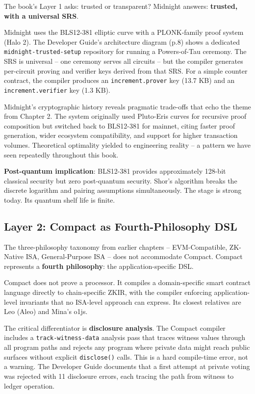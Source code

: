\documentclass[
  11pt,
  openany]{report}
\renewcommand{\textbf}[1]{{\bfseries\color{MidnightBold}#1}}
\begin{document}
The book's Layer 1 asks: trusted or transparent? Midnight answers:
\textbf{trusted, with a universal SRS}.

Midnight uses the BLS12-381 elliptic curve with a PLONK-family proof system
(Halo 2). The Developer Guide's architecture diagram (p.8) shows a dedicated
\texttt{midnight-trusted-setup} repository for running a Powers-of-Tau ceremony.
The SRS is universal -- one ceremony serves all circuits -- but the compiler
generates per-circuit proving and verifier keys derived from that SRS. For a
simple counter contract, the compiler produces an \texttt{increment.prover} key
(13.7 KB) and an \texttt{increment.verifier} key (1.3 KB).

Midnight's cryptographic history reveals pragmatic trade-offs that echo the
theme from Chapter 2. The system originally used Pluto-Eris curves for recursive
proof composition but switched back to BLS12-381 for mainnet, citing faster
proof generation, wider ecosystem compatibility, and support for higher
transaction volumes. Theoretical optimality yielded to engineering reality -- a
pattern we have seen repeatedly throughout this book.

\textbf{Post-quantum implication}: BLS12-381 provides approximately 128-bit
classical security but zero post-quantum security. Shor's algorithm breaks the
discrete logarithm and pairing assumptions simultaneously. The stage is strong
today. Its quantum shelf life is finite.

\subsection{Layer 2: Compact as Fourth-Philosophy
DSL}\label{layer-2-compact-as-fourth-philosophy-dsl}

The three-philosophy taxonomy from earlier chapters -- EVM-Compatible, ZK-Native
ISA, General-Purpose ISA -- does not accommodate Compact. Compact represents a
\textbf{fourth philosophy}: the application-specific DSL.

Compact does not prove a processor. It compiles a domain-specific smart contract
language directly to chain-specific ZKIR, with the compiler enforcing
application-level invariants that no ISA-level approach can express. Its closest
relatives are Leo (Aleo) and Mina's o1js.

The critical differentiator is \textbf{disclosure analysis}. The Compact
compiler includes a \texttt{track-witness-data} analysis pass that traces
witness values through all program paths and rejects any program where private
data might reach public surfaces without explicit \texttt{disclose()} calls.
This is a hard compile-time error, not a warning. The Developer Guide documents
that a first attempt at private voting was rejected with 11 disclosure errors,
each tracing the path from witness to ledger operation.
\end{document}
